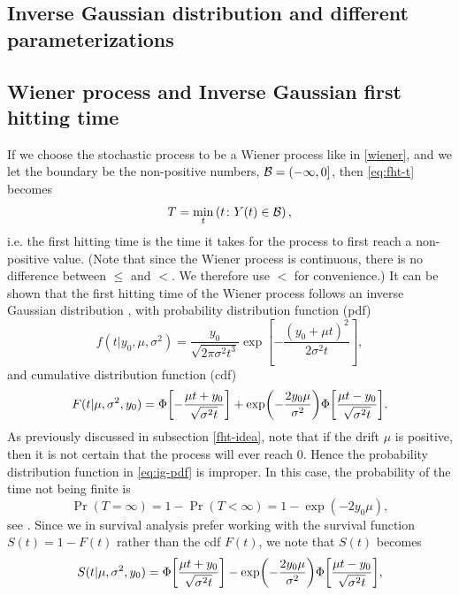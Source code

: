 \subsection{Inverse Gaussian distribution and different parameterizations}


\subsection{Wiener process and Inverse Gaussian first hitting time}
If we choose the stochastic process to be a Wiener process like in \eqref{wiener}, and we let the boundary be the non-positive numbers, $\mathcal{B}=(-\infty,0]$, then \eqref{eq:fht-t} becomes
\begin{equation}
    T=\min_t\left(t\colon Y(t)\in\mathcal{B}\right),
\end{equation}
i.e. the first hitting time is the time it takes for the process to first reach a non-positive value.
(Note that since the Wiener process is continuous, there is no difference between $\leq$ and $<$. We therefore use $<$ for convenience.)
It can be shown that the first hitting time of the Wiener process follows an inverse Gaussian distribution \citep{chhikara1988}, with probability distribution function (pdf)
\begin{equation}
\label{eq:ig-pdf}
    f(t|y_0,\mu,\sigma^2)=\frac{y_0}{\sqrt{2\pi\sigma^2t^3}}\exp\left[-\frac{(y_0+\mu t)^2}{2\sigma^2t}\right],
\end{equation}
and cumulative distribution function (cdf)
\begin{equation}
\label{eq:ig-cdf}
    F(t|\mu,\sigma^2,y_0)=\Phi\sqb*{-\frac{\mu t+y_0}{\sqrt{\sigma^2t}}}+\exp\p*{-\frac{2y_0\mu}{\sigma^2}}\Phi\sqb*{\frac{\mu t-y_0}{\sqrt{\sigma^2t}}}.
\end{equation}
As previously discussed in subsection \ref{fht-idea}, note that if the drift $\mu$ is positive, then it is not certain that the process will ever reach 0. Hence the probability distribution function in \eqref{eq:ig-pdf} is improper. In this case, the probability of the time not being finite is
\begin{equation*}
    \Pr{(T=\infty)}=1-\Pr{(T<\infty)}=1-\exp{(-2y_0\mu)},
\end{equation*}
see \citet{cox1965}. Since we in survival analysis prefer working with the survival function $S(t)=1-F(t)$ rather than the cdf $F(t)$, we note that $S(t)$ becomes
\begin{equation}
\label{eq:ig-surv}
    S(t|\mu,\sigma^2,y_0)=\Phi\sqb*{\frac{\mu t+y_0}{\sqrt{\sigma^2t}}}-\exp\p*{-\frac{2y_0\mu}{\sigma^2}}\Phi\sqb*{\frac{\mu t-y_0}{\sqrt{\sigma^2t}}},
\end{equation}
